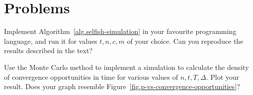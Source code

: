 \section*{Problems}

\begin{problems}
  \item Implement Algorithm~\ref{alg.selfish-simulation} in your favourite programming language,
        and run it for values $t, n, c, m$ of your choice. Can you reproduce the results described
        in the text?\label{problem.selfish-simulation}
  \item Use the Monte Carlo method to implement a simulation to calculate the density of
        convergence opportunities in time for various values of $n, t, T, \Delta$. Plot your
        result. Does your graph resemble Figure~\ref{fig.p-vs-convergence-opportunities}?








\end{problems}
